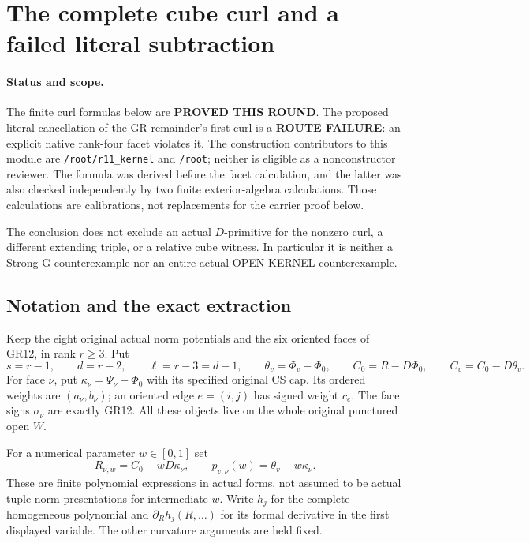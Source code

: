 \section{The complete cube curl and a failed literal subtraction}
\label{sec:r11-cube-curl-extraction}

\paragraph{Status and scope.}
The finite curl formulas below are \textbf{PROVED THIS ROUND}.
The proposed literal cancellation of the GR remainder's first curl
is a \textbf{ROUTE FAILURE}: an explicit native rank-four facet
violates it.  The construction contributors to this module are
\texttt{/root/r11\_kernel} and \texttt{/root}; neither is eligible
as a nonconstructor reviewer.  The formula was derived before the
facet calculation, and the latter was also checked independently
by two finite exterior-algebra calculations.  Those calculations
are calibrations, not replacements for the carrier proof below.

The conclusion does not exclude an actual $D$-primitive for the
nonzero curl, a different extending triple, or a relative cube
witness.  In particular it is neither a Strong G counterexample
nor an entire actual OPEN-KERNEL counterexample.

\subsection{Notation and the exact extraction}

Keep the eight original actual norm potentials and the six oriented
faces of GR12, in rank $r\ge3$.  Put
\[
 s=r-1,\qquad d=r-2,\qquad \ell=r-3=d-1,\qquad
 \theta_v=\Phi_v-\Phi_0,\qquad C_0=R-D\Phi_0,
 \qquad C_v=C_0-D\theta_v.
 \tag{CF1}
\]
For face $\nu$, put $\kappa_\nu=\Psi_\nu-\Phi_0$ with its
specified original CS cap.  Its ordered weights are
$(a_\nu,b_\nu)$; an oriented edge $e=(i,j)$ has signed weight
$c_e$.  The face signs $\sigma_\nu$ are exactly GR12.  All these
objects live on the whole original punctured open $W$.

For a numerical parameter $w\in[0,1]$ set
\[
 R_{\nu,w}=C_0-wD\kappa_\nu,\qquad
 p_{v,\nu}(w)=\theta_v-w\kappa_\nu.
 \tag{CF2}
\]
These are finite polynomial expressions in actual forms, not
assumed to be actual tuple norm presentations for intermediate
$w$.  Write $h_j$ for the complete homogeneous polynomial and
$\partial_Rh_j(R,\ldots)$ for its formal derivative in the first
displayed variable.  The other curvature arguments are held fixed.

